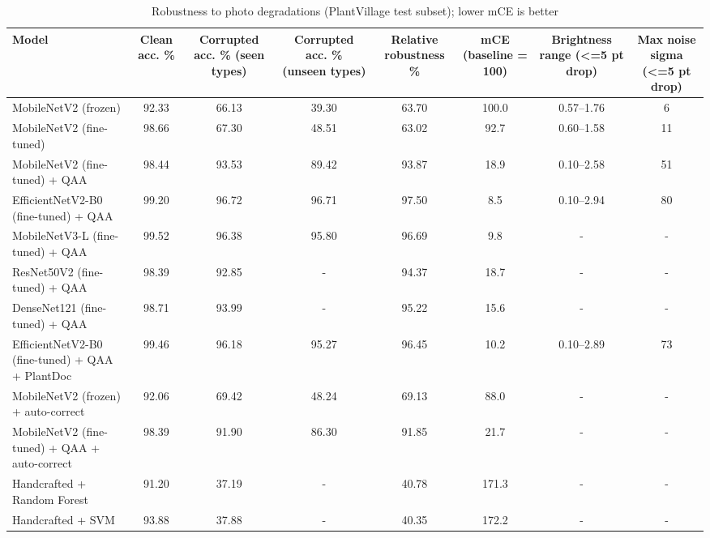 \begin{table}[t]
\centering
\small
\caption{Robustness to photo degradations (PlantVillage test subset); lower mCE is better}
\label{tab:table_robustness}
\begin{tabular}{lccccccc}
\toprule
Model & Clean acc. \% & Corrupted acc. \% (seen types) & Corrupted acc. \% (unseen types) & Relative robustness \% & mCE (baseline = 100) & Brightness range (<=5 pt drop) & Max noise sigma (<=5 pt drop) \\
\midrule
MobileNetV2 (frozen) & 92.33 & 66.13 & 39.30 & 63.70 & 100.0 & 0.57–1.76 & 6 \\
MobileNetV2 (fine-tuned) & 98.66 & 67.30 & 48.51 & 63.02 & 92.7 & 0.60–1.58 & 11 \\
MobileNetV2 (fine-tuned) + QAA & 98.44 & 93.53 & 89.42 & 93.87 & 18.9 & 0.10–2.58 & 51 \\
EfficientNetV2-B0 (fine-tuned) + QAA & 99.20 & 96.72 & 96.71 & 97.50 & 8.5 & 0.10–2.94 & 80 \\
MobileNetV3-L (fine-tuned) + QAA & 99.52 & 96.38 & 95.80 & 96.69 & 9.8 & - & - \\
ResNet50V2 (fine-tuned) + QAA & 98.39 & 92.85 & - & 94.37 & 18.7 & - & - \\
DenseNet121 (fine-tuned) + QAA & 98.71 & 93.99 & - & 95.22 & 15.6 & - & - \\
EfficientNetV2-B0 (fine-tuned) + QAA + PlantDoc & 99.46 & 96.18 & 95.27 & 96.45 & 10.2 & 0.10–2.89 & 73 \\
MobileNetV2 (frozen) + auto-correct & 92.06 & 69.42 & 48.24 & 69.13 & 88.0 & - & - \\
MobileNetV2 (fine-tuned) + QAA + auto-correct & 98.39 & 91.90 & 86.30 & 91.85 & 21.7 & - & - \\
Handcrafted + Random Forest & 91.20 & 37.19 & - & 40.78 & 171.3 & - & - \\
Handcrafted + SVM & 93.88 & 37.88 & - & 40.35 & 172.2 & - & - \\
\bottomrule
\end{tabular}
\end{table}

